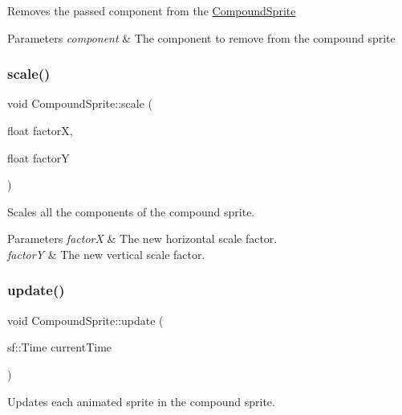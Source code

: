 Removes the passed component from the \hyperlink{class_compound_sprite}{Compound\+Sprite} 


\begin{DoxyParams}{Parameters}
{\em component} & The component to remove from the compound sprite\\
\hline
\end{DoxyParams}
\mbox{\label{class_compound_sprite_adec10c3d85333f75e767b6dc3210b0e7}} 
\subsubsection{\texorpdfstring{scale()}{scale()}}
{\footnotesize\ttfamily void Compound\+Sprite\+::scale (\begin{DoxyParamCaption}\item[{float}]{factorX,  }\item[{float}]{factorY }\end{DoxyParamCaption})}



Scales all the components of the compound sprite. 


\begin{DoxyParams}{Parameters}
{\em factorX} & The new horizontal scale factor.\\
\hline
{\em factorY} & The new vertical scale factor.\\
\hline
\end{DoxyParams}
\mbox{\label{class_compound_sprite_a0761cc2bdded00f203db7e4c6d02aa6c}} 
\subsubsection{\texorpdfstring{update()}{update()}}
{\footnotesize\ttfamily void Compound\+Sprite\+::update (\begin{DoxyParamCaption}\item[{sf\+::\+Time}]{current\+Time }\end{DoxyParamCaption})\hspace{0.3cm}{\ttfamily [virtual]}}



Updates each animated sprite in the compound sprite. 


